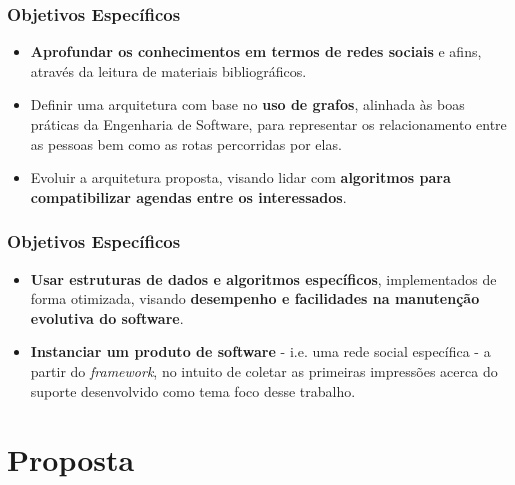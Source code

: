 \documentclass{beamer}
\begin{document}
\begin{frame}
\frametitle{Objetivos Específicos}

\begin{itemize}
	\item \textbf{Aprofundar os conhecimentos em termos de redes sociais} e afins, através da leitura de materiais bibliográficos.
	\item Definir uma arquitetura com base no \textbf{uso de grafos}, alinhada às boas práticas da Engenharia de Software, para representar os relacionamento entre as pessoas bem como as rotas percorridas por elas.
	\item Evoluir a arquitetura proposta, visando lidar com \textbf{algoritmos para compatibilizar agendas entre os interessados}.
\end{itemize}

\end{frame}

\begin{frame}
\frametitle{Objetivos Específicos}

\begin{itemize}
	\item \textbf{Usar estruturas de dados e algoritmos específicos}, implementados de forma otimizada, visando \textbf{desempenho e facilidades na manutenção evolutiva do software}.
	\item \textbf{Instanciar um produto de software} - i.e. uma rede social específica - a partir do \textit{framework}, no intuito de coletar as primeiras impressões acerca do suporte desenvolvido como tema foco desse trabalho.
\end{itemize}

\end{frame}

\section{Proposta}
\end{document}
